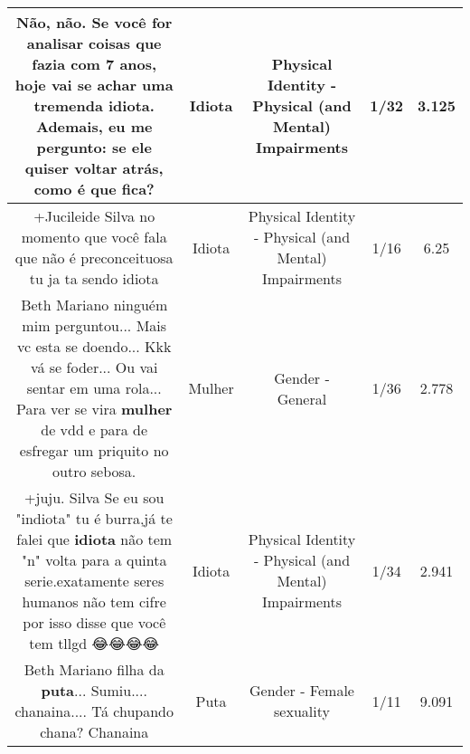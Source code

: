 \documentclass[11pt]{article}
\newlength\mylength
\begin{document}
\begin{center}
\begin{longtable}{|C{.65\mylength}|C{.30\mylength}|C{.12\mylength}|C{.12\mylength}|C{.12\mylength}|}
  \small Não, não. Se você for analisar coisas que fazia com 7 anos, hoje vai se achar uma tremenda \textbf{idiota}. Ademais, eu me pergunto: se ele quiser voltar atrás, como é que fica?\normalsize   & Idiota & Physical Identity - Physical (and Mental) Impairments & 1/32 & 3.125 \\  \hline
  \small +Jucileide Silva no momento que você fala que não é preconceituosa tu ja ta sendo idiota\normalsize   & Idiota & Physical Identity - Physical (and Mental) Impairments & 1/16 & 6.25 \\  \hline
  \small Beth Mariano ninguém mim perguntou... Mais vc esta se doendo... Kkk vá se foder... Ou vai sentar em uma rola... Para ver se vira \textbf{mulher} de vdd e para de esfregar um priquito no outro sebosa.\normalsize   & Mulher & Gender - General & 1/36 & 2.778 \\  \hline
  \small +juju. Silva Se eu sou "indiota" tu é burra,já te falei que \textbf{idiota} não tem "n" volta para a quinta serie.exatamente seres humanos não tem cifre por isso disse que você tem tllgd 😂😂😂😂\normalsize   & Idiota & Physical Identity - Physical (and Mental) Impairments & 1/34 & 2.941 \\  \hline
  \small Beth Mariano filha da \textbf{puta}... Sumiu....  chanaina.... Tá chupando chana? Chanaina\normalsize   & Puta & Gender - Female sexuality & 1/11 & 9.091 \\  \hline

\end{longtable}
\end{center}
\end{document}
